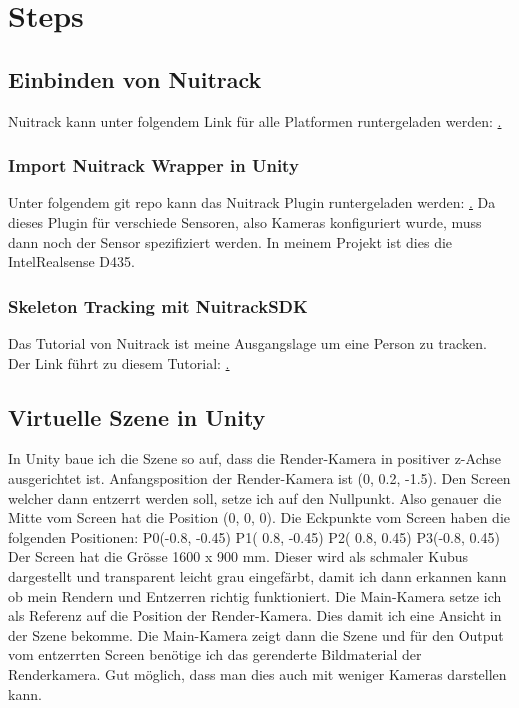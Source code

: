 \section{Steps}

\subsection{Einbinden von Nuitrack}
Nuitrack kann unter folgendem Link für alle Platformen runtergeladen werden: \href{https://github.com/3DiVi/nuitrack-sdk/blob/master/doc/Install.md} .

\subsubsection{Import Nuitrack Wrapper in Unity}
Unter folgendem git repo kann das Nuitrack Plugin runtergeladen werden: \href{https://github.com/3DiVi/nuitrack-sdk/blob/master/Unity3D/NuitrackSDK.unitypackage} . Da dieses Plugin für verschiede Sensoren, also Kameras konfiguriert wurde, muss dann noch der Sensor spezifiziert werden. In meinem Projekt ist dies die IntelRealsense D435.


\subsubsection{Skeleton Tracking mit NuitrackSDK}
Das Tutorial von Nuitrack ist meine Ausgangslage um eine Person zu tracken. Der Link führt zu diesem Tutorial: \href{https://github.com/3DiVi/nuitrack-sdk/blob/master/doc/Unity_Face_Tracking.md} .

\subsection{Virtuelle Szene in Unity}
In Unity baue ich die Szene so auf, dass die Render-Kamera in positiver z-Achse ausgerichtet ist. Anfangsposition der Render-Kamera ist (0, 0.2, -1.5). Den Screen welcher dann entzerrt werden soll, setze ich auf den Nullpunkt. Also genauer die Mitte vom Screen hat die Position (0, 0, 0).
Die Eckpunkte vom Screen haben die folgenden Positionen: 
P0(-0.8, -0.45)
P1( 0.8, -0.45)
P2( 0.8,  0.45)
P3(-0.8,  0.45)
Der Screen hat die Grösse 1600 x 900 mm. Dieser wird als schmaler Kubus dargestellt und transparent leicht grau eingefärbt, damit ich dann erkannen kann ob mein Rendern und Entzerren richtig funktioniert.
Die Main-Kamera setze ich als Referenz auf die Position der Render-Kamera. Dies damit ich eine Ansicht in der Szene bekomme. Die Main-Kamera zeigt dann die Szene und für den Output vom entzerrten Screen benötige ich das gerenderte Bildmaterial der Renderkamera. 
Gut möglich, dass man dies auch mit weniger Kameras darstellen kann.

